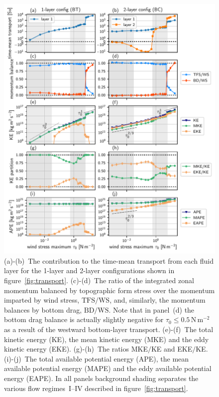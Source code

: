 \documentclass{agujournal2019}
\newcommand{\Pa}		{\mathrm{N}\,\mathrm{m}^{-2}}
\newcommand{\ws} {\mathrm{WS}}
\newcommand{\tfs} {\mathrm{TFS}}
\newcommand{\bd} {\mathrm{BD}}
\begin{document}
\begin{figure}
\centering
\noindent\includegraphics[width=\textwidth]{transp_mombal_KE_APE/transp_mombal_KE_APE}
\caption{(a)-(b)~The contribution to the time-mean transport from each fluid layer for the 1-layer and 2-layer configurations shown in figure~\ref{fig:transport}. (c)-(d)~The ratio of the integrated zonal momentum balanced by topographic form stress over the momentum imparted by wind stress, $\tfs/\ws$, and, similarly, the momentum balances by bottom drag, $\bd/\ws$. Note that in panel~(d) the bottom drag balance is actually slightly negative for $\tau_0\le 0.5\,\Pa$ as a result of the westward bottom-layer transport. (e)-(f)~The total kinetic energy (KE), the mean kinetic energy (MKE) and the eddy kinetic energy (EKE). (g)-(h)~The ratios  MKE$/$KE and EKE$/$KE. {\color{black}(i)-(j)~The total available potential energy (APE), the mean available potential energy (MAPE) and the eddy available potential energy (EAPE). } In all panels background shading separates the various flow regimes~I--IV described in figure~\ref{fig:transport}.}\label{fig:transportdecomp}\vspace*{-3em}
\end{figure}
\end{document}
